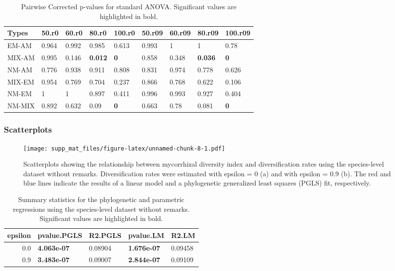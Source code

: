 \documentclass[]{article}
\begin{document}
\begin{table}[H]

\caption{\label{tab:unnamed-chunk-7}Pairwise Corrected p-values for standard ANOVA. Significant values are highlighted in bold.}
\centering
\begin{tabular}{l|l|l|l|l|l|l|l|l}
\hline
Types & 50.r0 & 60.r0 & 80.r0 & 100.r0 & 50.r09 & 60.r09 & 80.r09 & 100.r09\\
\hline
EM-AM & 0.964 & 0.992 & 0.985 & 0.613 & 0.993 & 1 & 1 & 0.78\\
\hline
MIX-AM & 0.995 & 0.146 & \textbf{0.012} & \textbf{0} & 0.858 & 0.348 & \textbf{0.036} & \textbf{0}\\
\hline
NM-AM & 0.776 & 0.938 & 0.911 & 0.808 & 0.831 & 0.974 & 0.778 & 0.626\\
\hline
MIX-EM & 0.954 & 0.769 & 0.704 & 0.237 & 0.866 & 0.768 & 0.622 & 0.106\\
\hline
NM-EM & 1 & 1 & 0.897 & 0.411 & 0.996 & 0.993 & 0.927 & 0.404\\
\hline
NM-MIX & 0.892 & 0.632 & 0.09 & \textbf{0} & 0.663 & 0.78 & 0.081 & \textbf{0}\\
\hline
\end{tabular}
\end{table}

\hypertarget{scatterplots}{%
\subsubsection{Scatterplots}\label{scatterplots}}

\begin{figure}
\centering
\texttt{[image: supp\_mat\_files/figure-latex/unnamed-chunk-8-1.pdf]}
\caption{Scatterplots showing the relationship between mycorrhizal
diversity index and diversification rates using the species-level
dataset without remarks. Diversification rates were estimated with
epsilon = 0 (a) and with epsilon = 0.9 (b). The red and blue lines
indicate the results of a linear model and a phylogenetic generalized
least squares (PGLS) fit, respectively.}
\end{figure}

\begin{table}[H]

\caption{\label{tab:unnamed-chunk-9}Summary statistics for the phylogenetic and parametric regressions using the species-level dataset without remarks. Significant values are highlighted in bold.}
\centering
\begin{tabular}{r|l|l|l|l}
\hline
epsilon & pvalue.PGLS & R2.PGLS & pvalue.LM & R2.LM\\
\hline
0.0 & \textbf{4.063e-07} & 0.08904 & \textbf{1.676e-07} & 0.09458\\
\hline
0.9 & \textbf{3.483e-07} & 0.09007 & \textbf{2.844e-07} & 0.09109\\
\hline
\end{tabular}
\end{table}
\end{document}

